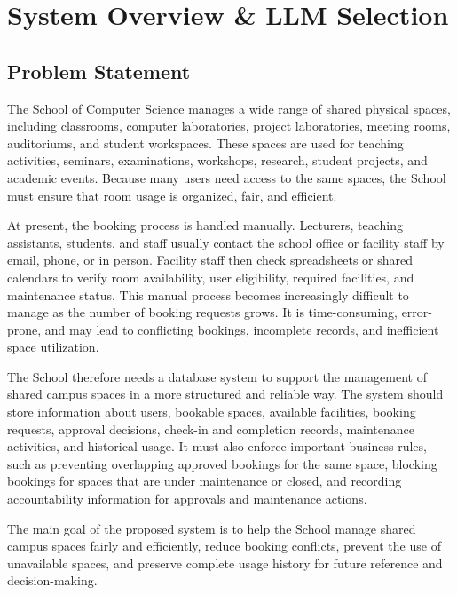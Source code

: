 \section{System Overview \& LLM Selection}
\subsection{Problem Statement}
The School of Computer Science manages a wide range of shared physical spaces, including classrooms, computer laboratories, project laboratories, meeting rooms, auditoriums, and student workspaces. These spaces are used for teaching activities, seminars, examinations, workshops, research, student projects, and academic events. Because many users need access to the same spaces, the School must ensure that room usage is organized, fair, and efficient.

At present, the booking process is handled manually. Lecturers, teaching assistants, students, and staff usually contact the school office or facility staff by email, phone, or in person. Facility staff then check spreadsheets or shared calendars to verify room availability, user eligibility, required facilities, and maintenance status. This manual process becomes increasingly difficult to manage as the number of booking requests grows. It is time-consuming, error-prone, and may lead to conflicting bookings, incomplete records, and inefficient space utilization.

The School therefore needs a database system to support the management of shared campus spaces in a more structured and reliable way. The system should store information about users, bookable spaces, available facilities, booking requests, approval decisions, check-in and completion records, maintenance activities, and historical usage. It must also enforce important business rules, such as preventing overlapping approved bookings for the same space, blocking bookings for spaces that are under maintenance or closed, and recording accountability information for approvals and maintenance actions.

The main goal of the proposed system is to help the School manage shared campus spaces fairly and efficiently, reduce booking conflicts, prevent the use of unavailable spaces, and preserve complete usage history for future reference and decision-making.

